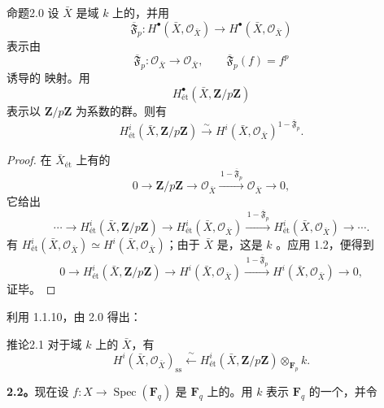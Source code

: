 \begin{SGAresult}{命题}{2.0}
设 $\bar X$ 是域 $k$ 上的，并用
\[
\overline{\mathfrak F}_p:
H^\bullet(\bar X,\mathcal O_{\bar X})\longrightarrow
H^\bullet(\bar X,\mathcal O_{\bar X}) \tag{2.0.1}
\]
表示由
\[
\overline{\mathfrak F}_p:\mathcal O_{\bar X}\longrightarrow\mathcal O_{\bar X},
\qquad\overline{\mathfrak F}_p(f)=f^p \tag{2.0.2}
\]
诱导的 映射。用
\[
H^\bullet_{\text{ét}}(\bar X,\mathbf Z/p\mathbf Z)
\]
表示以 $\mathbf Z/p\mathbf Z$ 为系数的群。则有
\[
H^i_{\text{ét}}(\bar X,\mathbf Z/p\mathbf Z)
\xrightarrow{\ \sim\ }
H^i(\bar X,\mathcal O_{\bar X})^{1-\overline{\mathfrak F}_p}. \tag{2.0.3}
\]
\end{SGAresult}
\begin{proof}
在 $\bar X_{\text{ét}}$ 上有的
\[
0\longrightarrow\mathbf Z/p\mathbf Z\longrightarrow\mathcal O_{\bar X}
\xrightarrow{\,1-\overline{\mathfrak F}_p\,}\mathcal O_{\bar X}
\longrightarrow0, \tag{2.0.4}
\]
它给出
\[
\cdots\longrightarrow H^i_{\text{ét}}(\bar X,\mathbf Z/p\mathbf Z)
\longrightarrow H^i_{\text{ét}}(\bar X,\mathcal O_{\bar X})
\xrightarrow{\,1-\overline{\mathfrak F}_p\,}
H^i_{\text{ét}}(\bar X,\mathcal O_{\bar X})\longrightarrow\cdots. \tag{2.0.5}
\]
有 $H^i_{\text{ét}}(\bar X,\mathcal O_{\bar X})\simeq H^i(\bar X,\mathcal O_{\bar X})$；由于 $\bar X$ 是，这是 $k$ 。应用 1.2，便得到
\[
0\longrightarrow H^i_{\text{ét}}(\bar X,\mathbf Z/p\mathbf Z)
\longrightarrow H^i(\bar X,\mathcal O_{\bar X})
\xrightarrow{\,1-\overline{\mathfrak F}_p\,}
H^i(\bar X,\mathcal O_{\bar X})\longrightarrow0, \tag{2.0.6}
\]
证毕。
\end{proof}
利用 1.1.10，由 2.0 得出：
\begin{SGAresult}{推论}{2.1}
对于域 $k$ 上的 $\bar X$，有
\[
H^i(\bar X,\mathcal O_{\bar X})_{\mathrm{ss}}
\xleftarrow{\ \sim\ }
H^i_{\text{ét}}(\bar X,\mathbf Z/p\mathbf Z)\otimes_{\mathbf F_p}k. \tag{2.1.1}
\]
\end{SGAresult}
\textbf{2.2。}现在设 $f:X\longrightarrow\operatorname{Spec}(\mathbf F_q)$ 是 $\mathbf F_q$ 上的。用 $k$ 表示 $\mathbf F_q$ 的一个，并令
